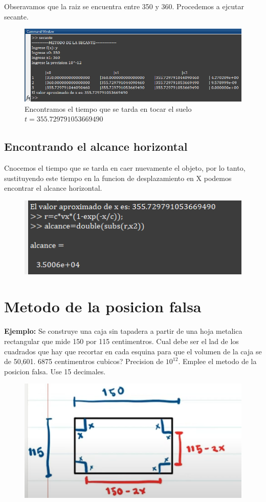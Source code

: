 \documentclass{article}
\theoremstyle{mytheoremstyle}
\theoremstyle{mytheoremstyle}
\theoremstyle{myproblemstyle}
\begin{document}
Obseravamos que la raiz se encuentra entre 350 y 360. Procedemos a ejcutar secante. 
\begin{figure}[ht]
    \includegraphics*[scale=0.7]{img/secante10.png}{\\ Encontramos el tiempo que se tarda en tocar el suelo $t=355.729791053669490$}
\end{figure}

\pagebreak
\subsection*{Encontrando el alcance horizontal}
Cnocemos el tiempo que se tarda en caer nuevamente el objeto, por lo tanto, sustituyendo este tiempo en la funcion de desplazamiento en X podemos 
encontrar el alcance horizontal.
\begin{figure}[ht]
    \includegraphics*[scale=0.6]{img/secante11.png}
\end{figure}

\pagebreak
\section*{Metodo de la posicion falsa}
\textbf{Ejemplo:} Se construye una caja sin tapadera a partir de una hoja metalica rectangular que mide 150 por 115 centimentros. Cual debe ser el lad de los cuadrados que hay que recortar en cada esquina para que
el volumen de la caja se de 50,601. 6875 centimentros cubicos? Precision de $10^{12}$. Emplee el metodo de la posicion falsa. Use 15 decimales.

\begin{figure}[ht]
    \includegraphics*[scale=1]{img/secante1.png}
\end{figure}
\end{document}
